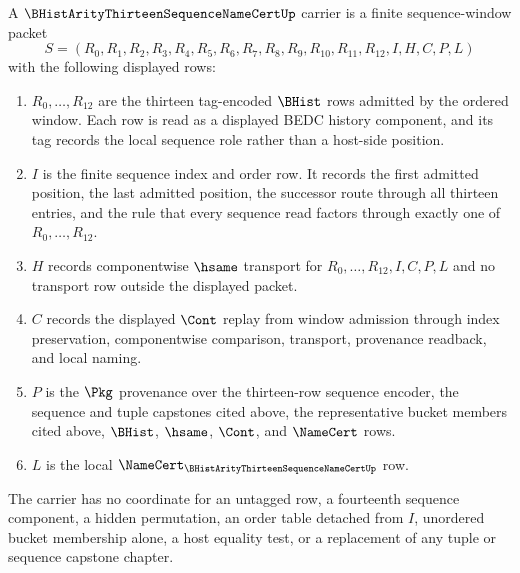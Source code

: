 \begin{definition}
\label{def:b-hist-arity13-sequence-name-cert-carrier}
A $\BHistArityThirteenSequenceNameCertUp$ carrier is a finite sequence-window packet
$$
S=(R_0,R_1,R_2,R_3,R_4,R_5,R_6,R_7,R_8,R_9,R_{10},R_{11},R_{12},I,H,C,P,L)
$$
with the following displayed rows:
\begin{enumerate}
\item $R_0,\ldots,R_{12}$ are the thirteen tag-encoded $\BHist$ rows admitted by the ordered window. Each row is read as a displayed BEDC history component, and its tag records the local sequence role rather than a host-side position.
\item $I$ is the finite sequence index and order row. It records the first admitted position, the last admitted position, the successor route through all thirteen entries, and the rule that every sequence read factors through exactly one of $R_0,\ldots,R_{12}$.
\item $H$ records componentwise $\hsame$ transport for $R_0,\ldots,R_{12},I,C,P,L$ and no transport row outside the displayed packet.
\item $C$ records the displayed $\Cont$ replay from window admission through index preservation, componentwise comparison, transport, provenance readback, and local naming.
\item $P$ is the $\Pkg$ provenance over the thirteen-row sequence encoder, the sequence and tuple capstones cited above, the representative bucket members cited above, $\BHist$, $\hsame$, $\Cont$, and $\NameCert$ rows.
\item $L$ is the local $\NameCert_{\BHistArityThirteenSequenceNameCertUp}$ row.
\end{enumerate}
The carrier has no coordinate for an untagged row, a fourteenth sequence component, a hidden permutation, an order table detached from $I$, unordered bucket membership alone, a host equality test, or a replacement of any tuple or sequence capstone chapter.
\end{definition}

